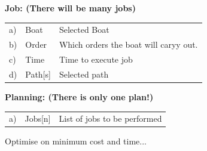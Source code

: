 \documentclass{article}
\begin{document}
\noindent
\textbf{Job: (There will be many jobs)}    

\begin{tabularx}{0.95\textwidth}{lll}
 a) & Boat& Selected Boat\\
 b) & Order& Which orders the boat will caryy out.\\
 c) & Time& Time to execute job\\
 d) & Path[s]& Selected path\\
\end{tabularx}
\vspace{1em}

\noindent
\textbf{Planning: (There is only one plan!)}    

\begin{tabularx}{0.95\textwidth}{lll}
 a) & Jobs[n]& List of jobs to be performed\\
\end{tabularx}
\vspace{1em}

\noindent
Optimise on minimum cost and time...
\end{document}
